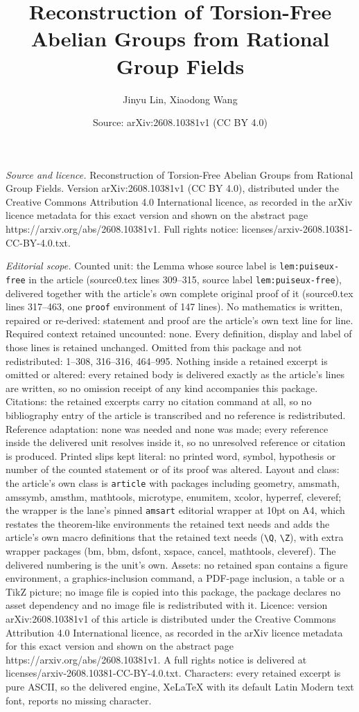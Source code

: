 \documentclass[10pt,a4paper]{amsart}
\title[Reconstruction of Torsion-Free Abelian Groups from Rational ]{Reconstruction of Torsion-Free Abelian Groups from Rational Group Fields}
\author{Jinyu Lin, Xiaodong Wang}
\date{Source: arXiv:2608.10381v1 (CC BY 4.0)}
\begin{document}
\maketitle

\noindent\emph{Source and licence.} Reconstruction of Torsion-Free Abelian Groups from Rational Group Fields. Version arXiv:2608.10381v1 (CC BY 4.0), distributed under the Creative Commons Attribution 4.0 International licence, as recorded in the arXiv licence metadata for this exact version and shown on the abstract page https://arxiv.org/abs/2608.10381v1. Full rights notice: licenses/arxiv-2608.10381-CC-BY-4.0.txt.\par\smallskip

\noindent\textit{Editorial scope.} Counted unit: the Lemma whose source label is \texttt{lem:puiseux-free} in the article (source0.tex lines 309--315, source label \texttt{lem:puiseux-free}), delivered together with the article's own complete original proof of it (source0.tex lines 317--463, one \texttt{proof} environment of 147 lines). No mathematics is written, repaired or re-derived: statement and proof are the article's own text line for line. Required context retained uncounted: none. Every definition, display and label of those lines is retained unchanged. Omitted from this package and not redistributed: 1--308, 316--316, 464--995. Nothing inside a retained excerpt is omitted or altered: every retained body is delivered exactly as the article's lines are written, so no omission receipt of any kind accompanies this package. Citations: the retained excerpts carry no citation command at all, so no bibliography entry of the article is transcribed and no reference is redistributed. Reference adaptation: none was needed and none was made; every reference inside the delivered unit resolves inside it, so no unresolved reference or citation is produced. Printed slips kept literal: no printed word, symbol, hypothesis or number of the counted statement or of its proof was altered. Layout and class: the article's own class is \texttt{article} with packages including geometry, amsmath, amssymb, amsthm, mathtools, microtype, enumitem, xcolor, hyperref, cleveref; the wrapper is the lane's pinned \texttt{amsart} editorial wrapper at 10pt on A4, which restates the theorem-like environments the retained text needs and adds the article's own macro definitions that the retained text needs (\texttt{\textbackslash Q}, \texttt{\textbackslash Z}), with extra wrapper packages (bm, bbm, dsfont, xspace, cancel, mathtools, cleveref). The delivered numbering is the unit's own. Assets: no retained span contains a figure environment, a graphics-inclusion command, a PDF-page inclusion, a table or a TikZ picture; no image file is copied into this package, the package declares no asset dependency and no image file is redistributed with it. Licence: version arXiv:2608.10381v1 of this article is distributed under the Creative Commons Attribution 4.0 International licence, as recorded in the arXiv licence metadata for this exact version and shown on the abstract page https://arxiv.org/abs/2608.10381v1. A full rights notice is delivered at licenses/arxiv-2608.10381-CC-BY-4.0.txt. Characters: every retained excerpt is pure ASCII, so the delivered engine, XeLaTeX with its default Latin Modern text font, reports no missing character.
\end{document}
